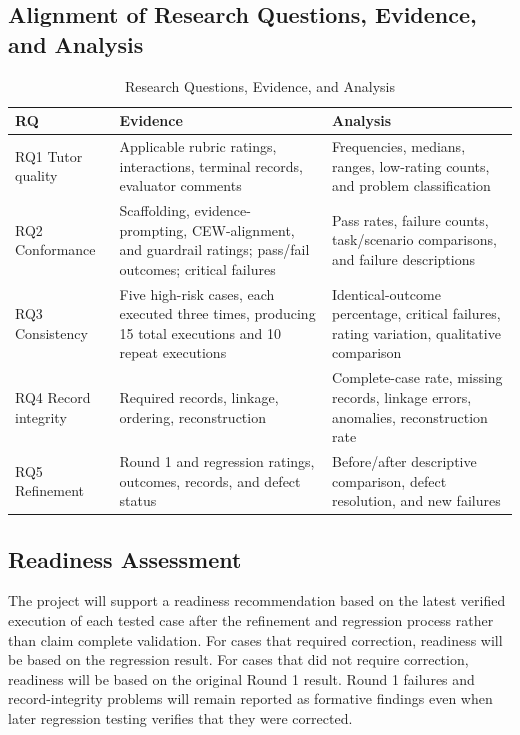 \documentclass[conference]{IEEEtran}
\begin{document}
\subsection{Alignment of Research Questions, Evidence, and Analysis}
\begin{table}[!t]
\caption{Research Questions, Evidence, and Analysis}
\label{tab:rq_alignment}
\centering
\footnotesize
\setlength{\tabcolsep}{4pt}
\renewcommand{\arraystretch}{1.08}
\begin{tabularx}{\textwidth}{@{}p{}p{}X@{}}
\toprule
\textbf{RQ} & \textbf{Evidence} & \textbf{Analysis} \\
\midrule
RQ1 Tutor quality & Applicable rubric ratings, interactions, terminal records, evaluator comments & Frequencies, medians, ranges, low-rating counts, and problem classification \\
RQ2 Conformance & Scaffolding, evidence-prompting, CEW-alignment, and guardrail ratings; pass/fail outcomes; critical failures & Pass rates, failure counts, task/scenario comparisons, and failure descriptions \\
RQ3 Consistency & Five high-risk cases, each executed three times, producing 15 total executions and 10 repeat executions & Identical-outcome percentage, critical failures, rating variation, qualitative comparison \\
RQ4 Record integrity & Required records, linkage, ordering, reconstruction & Complete-case rate, missing records, linkage errors, anomalies, reconstruction rate \\
RQ5 Refinement & Round 1 and regression ratings, outcomes, records, and defect status & Before/after descriptive comparison, defect resolution, and new failures \\
\bottomrule
\end{tabularx}
\end{table}

\subsection{Readiness Assessment}

The project will support a readiness recommendation based on the latest
verified execution of each tested case after the refinement and
regression process rather than claim complete validation. For cases that
required correction, readiness will be based on the regression result.
For cases that did not require correction, readiness will be based on
the original Round 1 result. Round 1 failures and record-integrity
problems will remain reported as formative findings even when later
regression testing verifies that they were corrected.
\end{document}
